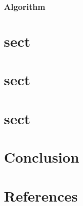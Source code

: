 \documentclass[final, paper=letter,5p,times,twocolumn]{elsarticle}
\begin{document}
\subsubsection{Algorithm}



\section{sect}

\section{sect}

\section{sect}


\section{Conclusion}

\section*{References}



\end{document}
